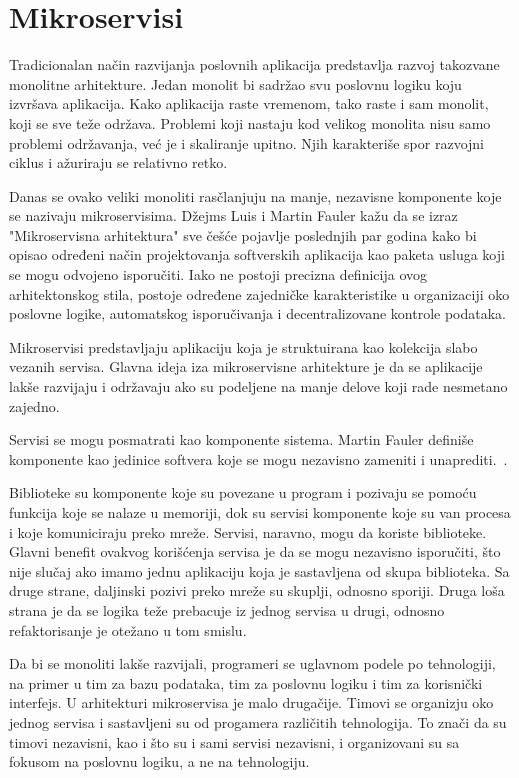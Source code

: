 \section{Mikroservisi}\label{sec:arhitektura-mikroservisi}

Tradicionalan način razvijanja poslovnih aplikacija predstavlja razvoj takozvane monolitne arhitekture. 
Jedan monolit bi sadržao svu poslovnu logiku koju izvršava aplikacija. Kako aplikacija raste vremenom, 
tako raste i sam monolit, koji se sve teže održava. Problemi koji nastaju kod velikog monolita nisu 
samo problemi održavanja, već je i skaliranje upitno. Njih karakteriše spor razvojni ciklus i ažuriraju se relativno retko.

Danas se ovako veliki monoliti rasčlanjuju na manje, nezavisne komponente koje se nazivaju mikroservisima. 
Džejms Luis i Martin Fauler kažu da se izraz "Mikroservisna arhitektura" sve češće pojavlje poslednjih 
par godina kako bi opisao određeni način projektovanja softverskih aplikacija kao paketa usluga koji se 
mogu odvojeno isporučiti. Iako ne postoji precizna definicija ovog arhitektonskog stila, postoje određene 
zajedničke karakteristike u organizaciji oko poslovne logike, automatskog isporučivanja i decentralizovane 
kontrole podataka.~\cite{martinfowler_microservices} 

Mikroservisi predstavljaju aplikaciju koja je struktuirana kao kolekcija slabo vezanih servisa. Glavna 
ideja iza mikroservisne arhitekture je da se aplikacije lakše razvijaju i održavaju ako su podeljene 
na manje delove koji rade nesmetano zajedno.

Servisi se mogu posmatrati kao komponente sistema. Martin Fauler definiše komponente kao jedinice 
softvera koje se mogu nezavisno zameniti i unaprediti.~\cite{martinfowler_software_component}.

Biblioteke su komponente koje su povezane u program i pozivaju se pomoću funkcija koje se nalaze u 
memoriji, dok su servisi komponente koje su van procesa i koje komuniciraju preko mreže.
Servisi, naravno, mogu da koriste biblioteke. Glavni benefit ovakvog korišćenja servisa je da se mogu 
nezavisno isporučiti, što nije slučaj ako imamo jednu aplikaciju koja je sastavljena od skupa biblioteka.
Sa druge strane, daljinski pozivi preko mreže su skuplji, odnosno sporiji. 
Druga loša strana je da se logika teže prebacuje iz jednog servisa u drugi, odnosno refaktorisanje je 
otežano u tom smislu.

Da bi se monoliti lakše razvijali, programeri se uglavnom podele po tehnologiji, na primer u tim za 
bazu podataka, tim za poslovnu logiku i tim za korisnički interfejs. U arhitekturi mikroservisa je malo 
drugačije. Timovi se organizju oko jednog servisa i sastavljeni su od progamera različitih tehnologija.
To znači da su timovi nezavisni, kao i što su i sami servisi nezavisni, i organizovani su sa fokusom na 
poslovnu logiku, a ne na tehnologiju.

